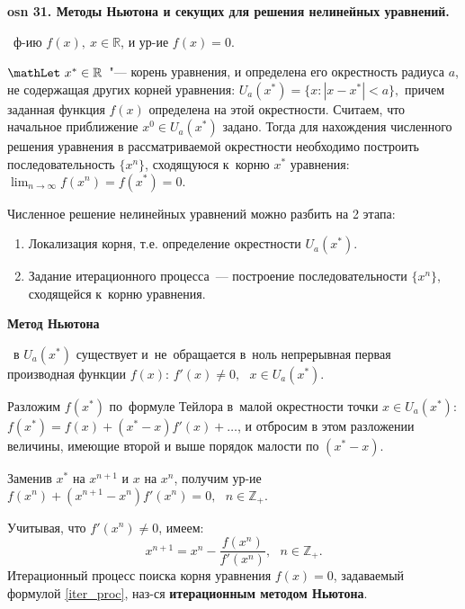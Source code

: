 \textbf{\LARGE osn 31. Методы Ньютона и секущих для решения нелинейных уравнений.}



\faEye \ ф-ию $f(x), ~x\in \mathbb{R}$, и ур-ие $f(x)=0.$

$\mathLet ~ x^* \in \mathbb{R}$~"--- корень уравнения, и определена его
окрестность радиуса $a$, не содержащая других корней уравнения: 
$U_a(x^*)=\{x:|x-x^*| < a\},$
причем заданная функция $f(x)$ определена на этой окрестности.
Считаем, что начальное приближение $x^0 \in U_a(x^*)$ задано.
Тогда для нахождения численного решения уравнения в
рассматриваемой окрестности необходимо построить последовательность
$\{x^n\}$, сходящуюся к~корню $x^*$ уравнения:
$\lim_{n\rightarrow\infty}f(x^n) = f(x^*) = 0.$
    
Численное решение нелинейных уравнений можно разбить на 2 этапа:
\begin{enumerate}
    \item Локализация корня, т.е. определение окрестности $U_a(x^*)$.
    \item Задание итерационного процесса~— построение последовательности
    $\{x^n\}$, сходящейся к~корню уравнения.
\end{enumerate}

\centerline{\textbf{Метод Ньютона}}

\mathLet \ в $U_a(x^*)$ существует и~не~обращается в~ноль непрерывная
первая производная функции $f(x)$: $f'(x) \neq 0,~~~x\in U_a(x^*).$

Разложим $f(x^*)$ по~формуле Тейлора в~малой окрестности точки $x\in U_a(x^*)$:
$f(x^*) =  f(x) + (x^* - x)f'(x) + \dots$, 
и отбросим в этом разложении величины, имеющие второй и выше порядок малости
по $(x^* - x)$.

Заменив $x^*$ на $x^{n+1}$ и $x$ на $x^n$, получим ур-ие 
$ f(x^n) + (x^{n + 1} - x^n)f'(x^n) = 0,~~~n\in \mathbb{Z}_+.$

Учитывая, что $f'(x^n) \neq 0$, имеем:
%
    \begin{equation}
        \label{iter_proc}
        x^{n + 1} = x^n - \frac{f(x^n)}{f'(x^n)},~~~n \in \mathbb{Z}_+.
    \end{equation}
%
Итерационный процесс поиска корня уравнения $f(x)=0$, задаваемый формулой \eqref{iter_proc},
наз-ся \textbf{итерационным методом Ньютона}.

